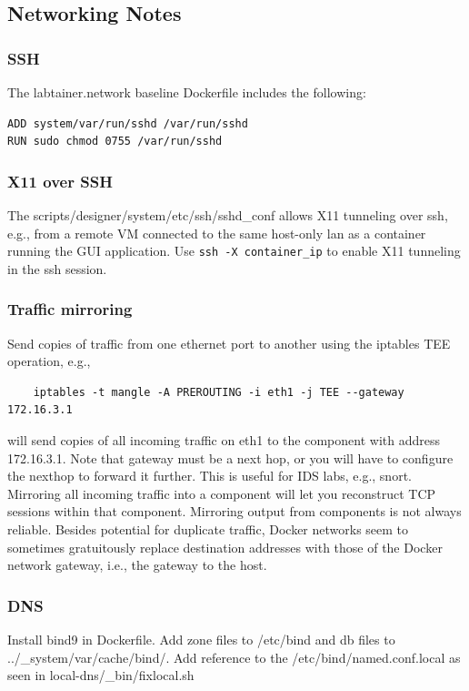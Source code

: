 \documentclass[12pt]{article}
\begin{document}
\subsection{Networking Notes}
\label{Networking Notes}
\subsubsection{SSH}
The labtainer.network baseline Dockerfile includes the following:
\begin{verbatim}
ADD system/var/run/sshd /var/run/sshd
RUN sudo chmod 0755 /var/run/sshd
\end{verbatim}

\subsubsection{X11 over SSH}
The scripts/designer/system/etc/ssh/sshd\_conf allows X11 tunneling over ssh, e.g.,
from a remote VM connected to the same host-only lan as a container running the GUI
application.  Use {\tt ssh -X container\_ip} to enable X11 tunneling in the ssh session.

\subsubsection{Traffic mirroring}
Send copies of traffic from one ethernet port to another using the iptables TEE operation, e.g.,
\begin{verbatim}
    iptables -t mangle -A PREROUTING -i eth1 -j TEE --gateway 172.16.3.1
\end{verbatim}
\noindent will send copies of all incoming traffic on eth1 to the component with address 172.16.3.1.
Note that gateway must be a next hop, or you will have to configure the nexthop to forward it further.
This is useful for IDS labs, e.g., snort.  Mirroring all incoming traffic into a component will let you
reconstruct TCP sessions within that component.  Mirroring output from components is not always reliable.
Besides potential for duplicate traffic, Docker networks seem to sometimes gratuitously replace destination
addresses with those of the Docker network gateway, i.e., the gateway to the host.

\subsubsection{DNS}
Install bind9 in Dockerfile.  Add zone files to /etc/bind and db files to ../\_system/var/cache/bind/.
Add reference to the /etc/bind/named.conf.local as seen in local-dns/\_bin/fixlocal.sh
\end{document}
